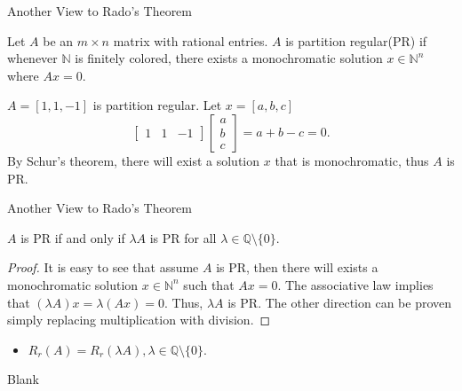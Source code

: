 \documentclass{beamer}
\newcommand{\N}{\mathbb N} %
\newcommand{\Q}{\mathbb Q} %
\begin{document}
\begin{frame}[t]{Another View to Rado's Theorem}
    \begin{definition}
        Let $A$ be an $m\times n$ matrix with rational entries. $A$ is partition regular(PR) if whenever $\N$ is finitely colored, there exists a monochromatic solution $x\in \N^n$ where $Ax=0$.
    \end{definition}
    \pause
    \begin{example}
        $A = [1, 1, -1]$ is partition regular. Let $x=[a,b,c]$
        \[
        \begin{bmatrix} 1 & 1 & -1 \end{bmatrix}
        \begin{bmatrix} a \\ b \\ c  \end{bmatrix} 
        = a+b-c=0.
        \]
        By Schur's theorem, there will exist a solution $x$ that is monochromatic, thus $A$ is PR.
    \end{example}
\end{frame}

\begin{frame}{Another View to Rado's Theorem}
    \begin{lemma}
        $A$ is PR if and only if $\lambda A$ is PR for all $\lambda \in \Q \setminus \{0\}$.
    \end{lemma}
    \pause
    \begin{proof}
        It is easy to see that assume $A$ is PR, then there will exists a monochromatic solution $x \in \N^n$ such that $Ax=0$. The associative law implies that $(\lambda A)x = \lambda(Ax) = 0$. Thus, $\lambda A$ is PR. The other direction can be proven simply replacing multiplication with division. 
    \end{proof}
    \pause
    \begin{itemize}
        \item $R_r(A) = R_r(\lambda A), \lambda \in \Q \setminus \{0\}$.
    \end{itemize}

\end{frame}

\begin{frame}{Blank}

\end{frame}
\end{document}
